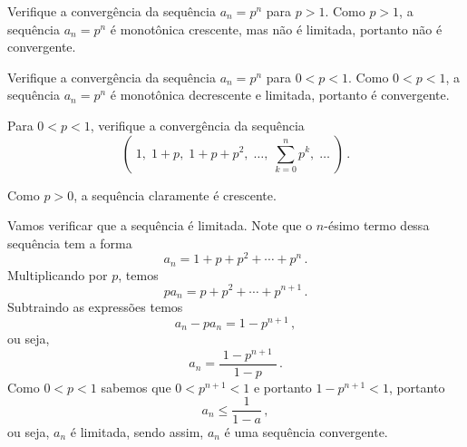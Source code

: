 \begin{example}
  Verifique a convergência da sequência $a_n = p^n$ para $p>1$.
  \solution
  Como $p>1$, a sequência $a_n = p^n$ é monotônica crescente,
  mas não é limitada, portanto não é convergente.
\end{example}

\begin{example}
  Verifique a convergência da sequência $a_n = p^n$ para $0<p<1$.
  \solution
  Como $0<p<1$, a sequência $a_n = p^n$ é monotônica decrescente e limitada,
  portanto é convergente.
\end{example}

\begin{example}
  Para $0<p<1$, verifique a convergência da sequência
  \[
    \left(\; 1, \; 1+p, \; 1+p+p^2, \; \dots, \; \sum_{k=0}^n p^k, \; \dots \; \right) \,.
  \]
  \solution

  Como $p>0$, a sequência claramente é crescente.

  Vamos verificar que a sequência é limitada.
  Note que o $n$-ésimo termo dessa sequência tem a forma
  \[
    a_n = 1 + p + p^2 + \cdots + p^n  \,.
  \]
  Multiplicando por $p$, temos
  \[
    pa_n = p + p^2 + \cdots + p^{n+1}  \,.
  \]
  Subtraindo as expressões temos
  \[
    a_n - pa_n = 1 - p^{n+1}   \,,
  \]
  ou seja,
  \[
    a_n = \frac{\;1-p^{n+1}\;}{1-p}  \,.
  \]
  Como $0<p<1$ sabemos que $0<p^{n+1}<1$ e portanto $1-p^{n+1}<1$, portanto
  \[
    a_n \leq \frac{1}{1-a}   \,,
  \]
  ou seja, $a_n$ é limitada, sendo assim, $a_n$ é uma sequência convergente.
\end{example}

